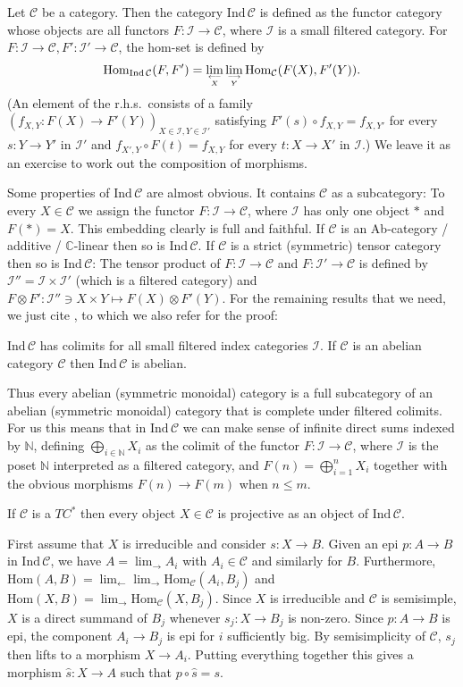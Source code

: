 \documentclass[12pt]{article}
\theoremstyle{definition}
\theoremstyle{definition}
\theoremstyle{remark}
\def\2#1{{\mathcal #1}}
\def\7#1{{\mathbb #1}}
\newcommand{\Hom}{\mathrm{Hom}}
\newcommand{\rarr}{\rightarrow}
\begin{document}
\bdefin Let $\2C$ be a category. Then the category
$\mathrm{Ind}\,\2C$ is defined as the functor category
whose objects are all functors $F:\2I\rarr\2C$, where
$\2I$ is a small filtered category.  For
$F:\2I\rarr\2C, F':\2I'\rarr\2C$, the hom-set is
defined by
\[ \Hom_{\mathrm{Ind}\,\2C}(F,F')=\lim_{\longleftarrow\atop X}\lim_{\longrightarrow\atop Y}
   \Hom_\2C(F(X),F'(Y)). \]
(An element of the r.h.s.\ consists of a family 
$(f_{X,Y}: F(X)\rarr F'(Y))_{X\in\2I, Y\in\2I'}$ satisfying $F'(s)\circ f_{X,Y}=f_{X,Y'}$ for every
$s:Y\rarr Y'$ in $\2I'$ and $f_{X',Y}\circ F(t)=f_{X,Y}$ for every $t:X\rarr X'$ in $\2I$.) We leave
it as an exercise to work out the composition of morphisms.
\edefin

Some properties of $\mathrm{Ind}\,\2C$ are almost obvious. It contains $\2C$ as a subcategory: To
every $X\in\2C$ we assign the functor $F:\2I\rarr\2C$, where $\2I$ has only one object $*$ and
$F(*)=X$. This embedding clearly is full and faithful. If $\2C$ is an 
Ab-category / additive / $\7C$-linear then so is $\mathrm{Ind}\,\2C$. If $\2C$ is a strict
(symmetric) tensor category then so is $\mathrm{Ind}\,\2C$: The tensor product of $F:\2I\rarr\2C$
and $F:\2I'\rarr\2C$ is defined by $\2I''=\2I\times\2I'$ (which is a filtered category) and 
$F\otimes F': \2I''\ni X\times Y\mapsto F(X)\otimes F'(Y)$. For the remaining results that we need,
we just cite \cite{SGA4}, to which we also refer for the proof:

\btheor 
$\mathrm{Ind}\,\2C$ has colimits for all small filtered index categories $\2I$.
If $\2C$ is an abelian category $\2C$ then $\mathrm{Ind}\,\2C$ is abelian.
\etheor

Thus every abelian (symmetric monoidal) category is a full subcategory of an abelian (symmetric monoidal)
category that is complete under filtered colimits. For us this means that in $\mathrm{Ind}\,\2C$ we
can make sense of infinite direct sums indexed by $\7N$, defining $\bigoplus_{i\in\7N} X_i$ as the
colimit of the functor $F:\2I\rarr\2C$, where $\2I$ is the poset $\7N$ interpreted as a filtered
category, and $F(n)=\bigoplus_{i=1}^n X_i$ together with the obvious morphisms $F(n)\rarr F(m)$ when
$n\le m$. 

\blemma \label{lem-proj}
If $\2C$ is a $TC^*$ then every object $X\in\2C$ is projective as an object of $\mathrm{Ind}\,\2C$.
\elemma

\prf First assume that $X$ is irreducible and consider $s:X\rarr B$. Given an epi $p:A\rarr B$ in
$\mathrm{Ind}\,\2C$, we have $A=\lim_{\longrightarrow}A_i$ with $A_i\in\2C$ and similarly for $B$.
Furthermore, $\Hom(A,B)=\lim_{\longleftarrow}\lim_{\longrightarrow}\Hom_\2C(A_i,B_j)$ and
$\Hom(X,B)=\lim_{\longrightarrow}\Hom_\2C(X,B_j)$. Since $X$ is irreducible and $\2C$ is semisimple,
$X$ is a direct summand of $B_j$ whenever $s_j:X\rarr B_j$ is non-zero. Since $p:A\rarr B$ is epi, the
component $A_i\rarr B_j$ is epi for $i$ sufficiently big. By semisimplicity of $\2C$, $s_j$ then
lifts to a morphism $X\rarr A_i$. Putting everything together this gives a morphism
$\widehat{s}:X\rarr A$ such that $p\circ\widehat{s}=s$.
\end{document}
